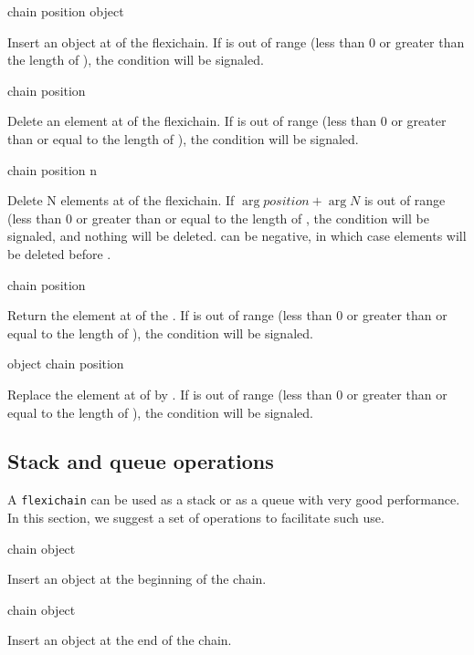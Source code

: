 \documentclass[11pt]{article}
\begin{document}
 {chain position object}

Insert an object at  of the flexichain.  If
 is out of range (less than $0$ or greater than the
length of ), the  condition will be
signaled.

 {chain position}

Delete an element at  of the flexichain.  If
 is out of range (less than $0$ or greater than or equal
to the length of ), the  condition will be
signaled.

 {chain position n}

Delete N elements at  of the flexichain. If
$\arg{position}+\arg{N}$ is out of range (less than $0$ or greater
than or equal to the length of , the
 condition will be signaled, and nothing will
be deleted.  can be negative, in which case elements will be
deleted before .

 {chain position}

Return the element at  of the .  If
 is out of range (less than $0$ or greater than or equal
to the length of ), the  condition will be
signaled.

 {object chain position}

Replace the element at  of  by .
If  is out of range (less than $0$ or greater than or
equal to the length of ), the  condition
will be signaled.

\subsection{Stack and queue operations}

A \texttt{flexichain} can be used as a stack or as a queue with very good
performance.  In this section, we suggest a set of operations to
facilitate such use.

 {chain object}

Insert an object at the beginning of the chain.

 {chain object}

Insert an object at the end of the chain.
\end{document}

